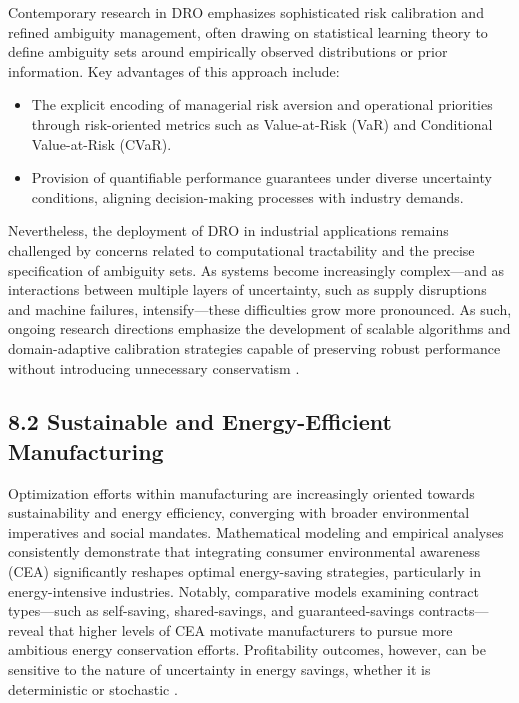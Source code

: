 \documentclass[11pt]{article}
\begin{document}
Contemporary research in DRO emphasizes sophisticated risk calibration and refined ambiguity management, often drawing on statistical learning theory to define ambiguity sets around empirically observed distributions or prior information. Key advantages of this approach include:

\begin{itemize}
    \item The explicit encoding of managerial risk aversion and operational priorities through risk-oriented metrics such as Value-at-Risk (VaR) and Conditional Value-at-Risk (CVaR).
    \item Provision of quantifiable performance guarantees under diverse uncertainty conditions, aligning decision-making processes with industry demands.
\end{itemize}

Nevertheless, the deployment of DRO in industrial applications remains challenged by concerns related to computational tractability and the precise specification of ambiguity sets. As systems become increasingly complex—and as interactions between multiple layers of uncertainty, such as supply disruptions and machine failures, intensify—these difficulties grow more pronounced. As such, ongoing research directions emphasize the development of scalable algorithms and domain-adaptive calibration strategies capable of preserving robust performance without introducing unnecessary conservatism \cite{ref77}.

\subsection{8.2 Sustainable and Energy-Efficient Manufacturing}

Optimization efforts within manufacturing are increasingly oriented towards sustainability and energy efficiency, converging with broader environmental imperatives and social mandates. Mathematical modeling and empirical analyses consistently demonstrate that integrating consumer environmental awareness (CEA) significantly reshapes optimal energy-saving strategies, particularly in energy-intensive industries. Notably, comparative models examining contract types—such as self-saving, shared-savings, and guaranteed-savings contracts—reveal that higher levels of CEA motivate manufacturers to pursue more ambitious energy conservation efforts. Profitability outcomes, however, can be sensitive to the nature of uncertainty in energy savings, whether it is deterministic or stochastic \cite{ref80}.
\end{document}
